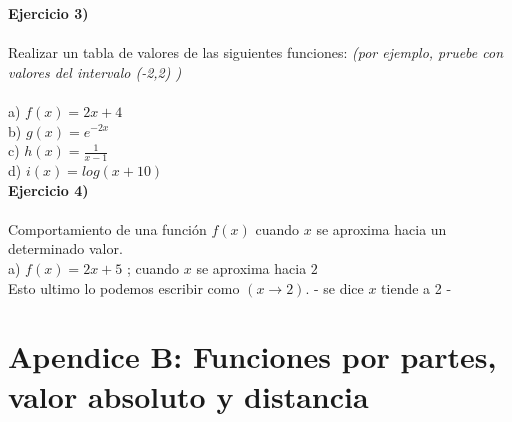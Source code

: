 \documentclass[11pt, a4paper]{article}
\begin{document}
{\textbf{ Ejercicio 3) } \\ \\
Realizar un tabla de valores de las siguientes funciones: \textit{(por ejemplo, pruebe con valores del intervalo (-2,2) ) } \\ \\
a) $ f(x) = 2x + 4 $ \\
b) $ g(x) = e^{-2x} $ \\
c) $ \displaystyle h(x) = \frac{1}{x-1} $ \\
d) $ i(x) = log( x + 10) $ \\ 

\textbf{ Ejercicio 4) } \\ \\
Comportamiento de una funci\'on $f(x)$ cuando $x$ se aproxima hacia un determinado valor. \\

a) $ f(x) = 2x + 5 $ ; cuando $x$ se aproxima hacia $2$ \\ 
Esto ultimo lo podemos escribir como  $( x \to 2 )$. - se dice $x$ tiende a 2 -  





\section{ Apendice B: Funciones por partes, valor absoluto y distancia }

}
\end{document}

